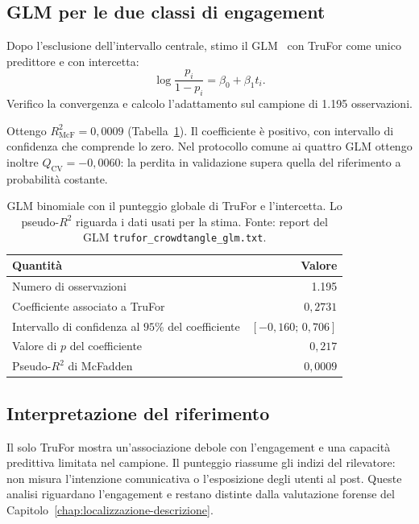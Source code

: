 \subsection{GLM per le due classi di engagement}
\label{subsec:risultati-trufor-glm}

Dopo l'esclusione dell'intervallo centrale, stimo il GLM~\cite{68aee965-a8a0-3e72-9f89-8d89ae91a62b} con TruFor come unico predittore e con intercetta:
\begin{equation}
    \log\frac{p_i}{1-p_i}=\beta_0+\beta_1t_i.
    \label{eq:materiali-glm}
\end{equation}
Verifico la convergenza e calcolo l'adattamento sul campione di 1.195 osservazioni.

Ottengo $R^2_{\mathrm{McF}}=0{,}0009$ (Tabella~\ref{tab:risultati-trufor-glm}). Il coefficiente è positivo, con intervallo di confidenza che comprende lo zero. Nel protocollo comune ai quattro GLM ottengo inoltre $Q_{\mathrm{CV}}=-0{,}0060$: la perdita in validazione supera quella del riferimento a probabilità costante.

\begin{table}[htbp]
    \centering
    \small
    \caption{GLM binomiale con il punteggio globale di TruFor e l'intercetta. Lo pseudo-$R^2$ riguarda i dati usati per la stima. Fonte: report del GLM \texttt{trufor\_crowdtangle\_glm.txt}.}
    \label{tab:risultati-trufor-glm}
    \begin{tabular}{@{}lr@{}}
        \toprule
        Quantità & Valore \\
        \midrule
        Numero di osservazioni & 1.195 \\
        Coefficiente associato a TruFor & $0{,}2731$ \\
        Intervallo di confidenza al $95\%$ del coefficiente & $[-0{,}160;\,0{,}706]$ \\
        Valore di $p$ del coefficiente & $0{,}217$ \\
        Pseudo-$R^2$ di McFadden & $0{,}0009$ \\
        \bottomrule
    \end{tabular}
\end{table}

\subsection{Interpretazione del riferimento}
\label{subsec:risultati-trufor-riferimento}

Il solo TruFor mostra un'associazione debole con l'engagement e una capacità predittiva limitata nel campione. Il punteggio riassume gli indizi del rilevatore: non misura l'intenzione comunicativa o l'esposizione degli utenti al post. Queste analisi riguardano l'engagement e restano distinte dalla valutazione forense del Capitolo~\ref{chap:localizzazione-descrizione}.


